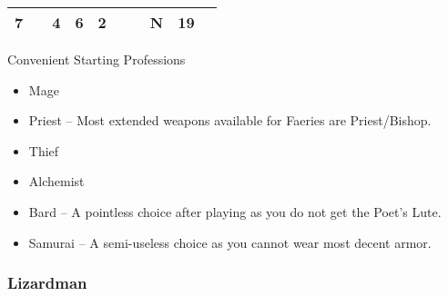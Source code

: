 \documentclass[12pt]{article}
\newcommand{\WviiTwoColumnSetup}{\raggedcolumns\RaggedRight}
\begin{document}
\begin{longtable}[]{@{}llllllllll@{}}
\begin{minipage}[t]{0.06\columnwidth}\raggedright\strut
7
\strut\end{minipage} &
\begin{minipage}[t]{0.06\columnwidth}\raggedright\strut
\strut\end{minipage} &
\begin{minipage}[t]{0.06\columnwidth}\raggedright\strut
4
\strut\end{minipage} &
\begin{minipage}[t]{0.06\columnwidth}\raggedright\strut
6
\strut\end{minipage} &
\begin{minipage}[t]{0.06\columnwidth}\raggedright\strut
2
\strut\end{minipage} &
\begin{minipage}[t]{0.06\columnwidth}\raggedright\strut
\strut\end{minipage} &
\begin{minipage}[t]{0.06\columnwidth}\raggedright\strut
\strut\end{minipage} &
\begin{minipage}[t]{0.07\columnwidth}\raggedright\strut
N
\strut\end{minipage} &
\begin{minipage}[t]{0.08\columnwidth}\raggedright\strut
19
\strut\end{minipage}\tabularnewline
\bottomrule
\end{longtable}

Convenient Starting Professions

\begin{multicols}{2}\WviiTwoColumnSetup
\begin{itemize}
\item
  Mage
\item
  Priest -- Most extended weapons available for Faeries are
  Priest\fshyp{}Bishop.
\item
  Thief
\item
  Alchemist
\item
  Bard -- A pointless choice after playing as you do not get the Poet's
  Lute.
\item
  Samurai -- A semi-useless choice as you cannot wear most decent armor.
\end{itemize}
\end{multicols}

\subsubsection{Lizardman}\label{lizardman}
\end{document}
